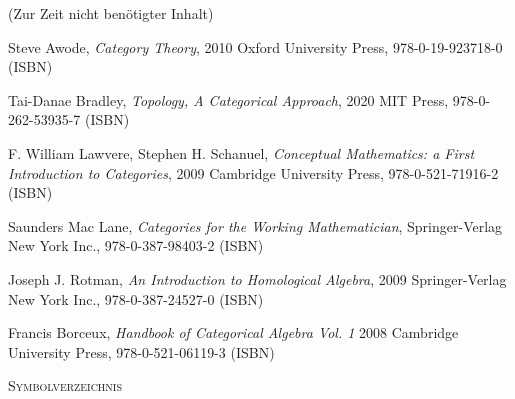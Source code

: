 \documentclass[a4paper]{amsart}
\theoremstyle{definition}
\begin{document}
\begin{backup}
    (Zur Zeit nicht benötigter Inhalt)
\end{backup}

\begin{thebibliography}{9}
      Steve Awode, \emph{Category Theory},
      2010 Oxford University Press, 978-0-19-923718-0 (ISBN)

      Tai-Danae Bradley, \emph{Topology, A Categorical Approach},
      2020 MIT Press, 978-0-262-53935-7 (ISBN)

      F. William Lawvere, Stephen H. Schanuel, \emph{Conceptual Mathematics: a First Introduction to Categories},
      2009 Cambridge University Press, 978-0-521-71916-2 (ISBN)

      Saunders Mac Lane, \emph{Categories for the Working Mathematician},
      Springer-Verlag New York Inc., 978-0-387-98403-2 (ISBN)

   	Joseph J. Rotman, \emph{An Introduction to Homological Algebra},
   	2009 Springer-Verlag New York Inc., 978-0-387-24527-0 (ISBN)
      
      Francis Borceux, \emph{Handbook of Categorical Algebra Vol. 1}
      2008 Cambridge University Press, 978-0-521-06119-3 (ISBN)

\end{thebibliography}

\begin{large}
    \centerline{\textsc{Symbolverzeichnis}}
\end{large}
\bigskip
\end{document}
